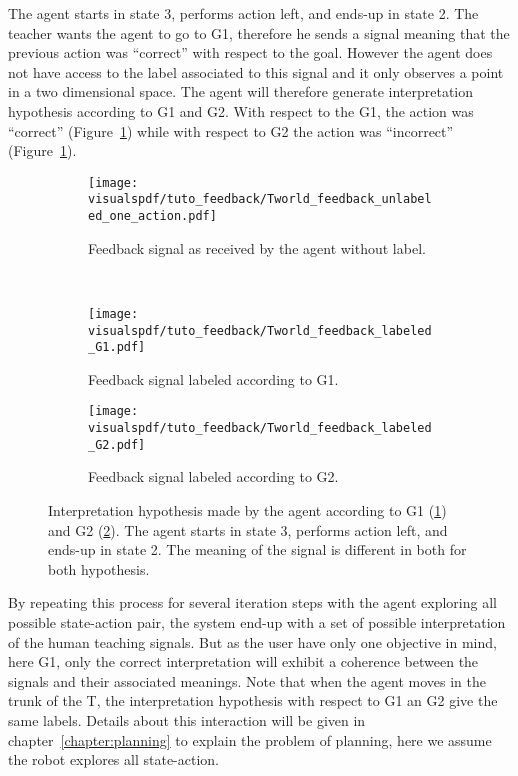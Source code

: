 The agent starts in state 3, performs action left, and ends-up in state 2. The teacher wants the agent to go to G1, therefore he sends a signal meaning that the previous action was ``correct'' with respect to the goal. However the agent does not have access to the label associated to this signal and it only observes a point in a two dimensional space. The agent will therefore generate interpretation hypothesis according to G1 and G2. With respect to the G1, the action was ``correct'' (Figure~\ref{fig:TworldLabelG1}) while with respect to G2 the action was ``incorrect'' (Figure~\ref{fig:TworldLabelG1}).

\begin{figure}[!htbp]
    \centering
    \begin{subfigure}[b]{\tworldsize\columnwidth}
        \centering
        \texttt{[image: \\visualspdf/tuto\_feedback/Tworld\_feedback\_unlabeled\_one\_action.pdf]}
        \caption{Feedback signal as received by the agent without label.}
    \end{subfigure}\\
    \begin{subfigure}[b]{\tworldsize\columnwidth}
        \centering
        \texttt{[image: \\visualspdf/tuto\_feedback/Tworld\_feedback\_labeled\_G1.pdf]}
        \caption{Feedback signal labeled according to G1.}
        \label{fig:TworldLabelG1}
    \end{subfigure}
    \begin{subfigure}[b]{\tworldsize\columnwidth}
        \centering
        \texttt{[image: \\visualspdf/tuto\_feedback/Tworld\_feedback\_labeled\_G2.pdf]}
        \caption{Feedback signal labeled according to G2.}
        \label{fig:TworldLabelG2}
    \end{subfigure}
    \caption{Interpretation hypothesis made by the agent according to G1 (\ref{fig:TworldLabelG1}) and G2 (\ref{fig:TworldLabelG2}). The agent starts in state 3, performs action left, and ends-up in state 2. The meaning of the signal is different in both for both hypothesis.}
    \label{fig:TworldLabelOneStep}
\end{figure}

By repeating this process for several iteration steps with the agent exploring all possible state-action pair, the system end-up with a set of possible interpretation of the human teaching signals. But as the user have only one objective in mind, here G1, only the correct interpretation will exhibit a coherence between the signals and their associated meanings. Note that when the agent moves in the trunk of the T, the interpretation hypothesis with respect to G1 an G2 give the same labels. Details about this interaction will be given in chapter~\ref{chapter:planning} to explain the problem of planning, here we assume the robot explores all state-action.

